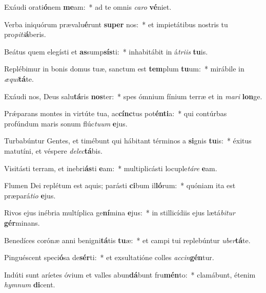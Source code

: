 \item Exáudi orati\textbf{ó}nem \textbf{me}am:~* ad te omnis \textit{ca}\textit{ro} \textbf{vé}niet.
\item Verba iniquórum prævalu\textbf{é}runt \textbf{su}\textbf{per} nos:~* et impietátibus nostris tu pro\textit{pi}\textit{ti}\textbf{á}beris.
\item Beátus quem elegísti et \textbf{as}sump\textbf{sís}ti:~* inhabitábit in á\textit{tri}\textit{is} \textbf{tu}is.
\item Replébimur in bonis domus tuæ, sanctum est \textbf{tem}plum \textbf{tu}um:~* mirábile in \textit{æ}\textit{qui}\textbf{tá}te.
\item Exáudi nos, Deus salu\textbf{tá}ris \textbf{nos}ter:~* spes ómnium fínium terræ et in \textit{ma}\textit{ri} \textbf{lon}ge.
\item Prǽparans montes in virtúte tua, ac\textbf{cínc}tus pot\textbf{én}\textbf{ti}a:~* qui contúrbas profúndum maris sonum flúc\textit{tu}\textit{um} \textbf{e}jus.
\item Turbabúntur Gentes, et timébunt qui hábitant términos a \textbf{si}gnis \textbf{tu}is:~* éxitus matutíni, et véspere \textit{de}\textit{lec}\textbf{tá}bis.
\item Visitásti terram, et inebri\textbf{ás}ti \textbf{e}am:~* multiplicásti locuple\textit{tá}\textit{re} \textbf{e}am.
\item Flumen Dei replétum est aquis; parásti \textbf{ci}bum il\textbf{ló}rum:~* quóniam ita est præpará\textit{ti}\textit{o} \textbf{e}jus.
\item Rivos ejus inébria multíplica ge\textbf{ní}mina \textbf{e}jus:~* in stillicídiis ejus lætá\textit{bi}\textit{tur} \textbf{gér}minans.
\item Benedíces corónæ anni benigni\textbf{tá}tis \textbf{tu}æ:~* et campi tui replebúntur \textit{u}\textit{ber}\textbf{tá}te.
\item Pinguéscent speci\textbf{ó}sa de\textbf{sér}ti:~* et exsultatióne colles \textit{ac}\textit{cin}\textbf{gén}tur.
\item Indúti sunt aríetes óvium et valles abun\textbf{dá}bunt fru\textbf{mén}to:~* clamábunt, étenim \textit{hym}\textit{num} \textbf{di}cent.
